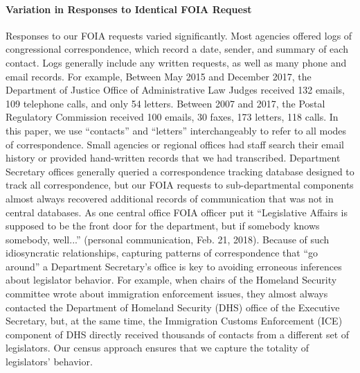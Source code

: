 \documentclass{article}
\begin{document}
\paragraph{Variation in Responses to Identical FOIA Request} Responses to our FOIA requests varied significantly. Most agencies offered logs of congressional correspondence, which record a date, sender, and summary of each contact. Logs generally include any written requests, as well as many phone and email records. For example, Between May 2015 and December 2017, the Department of Justice Office of Administrative Law Judges received 132 emails, 109 telephone calls, and only 54 letters. Between 2007 and 2017, the Postal Regulatory Commission received 100 emails, 30 faxes, 173 letters, 118 calls. In this paper, we use ``contacts'' and ``letters'' interchangeably to refer to all modes of correspondence. Small agencies or regional offices had staff search their email history or provided hand-written records that we had transcribed.  Department Secretary offices generally queried a correspondence tracking database designed to track all correspondence, but our FOIA requests to sub-departmental components almost always recovered additional records of communication that was not in central databases. As one central office FOIA officer put it ``Legislative Affairs is supposed to be the front door for the department, but if somebody knows somebody, well...'' (personal communication, Feb. 21, 2018). Because of such idiosyncratic relationships, capturing patterns of correspondence that ``go around'' a Department Secretary's office is key to avoiding erroneous inferences about legislator behavior. For example, when chairs of the Homeland Security committee wrote about immigration enforcement issues, they almost always contacted the Department of Homeland Security (DHS) office of the Executive Secretary, but, at the same time, the Immigration Customs Enforcement (ICE) component of DHS directly received thousands of contacts from a different set of legislators. Our census approach ensures that we capture the totality of legislators' behavior. 
\end{document}
